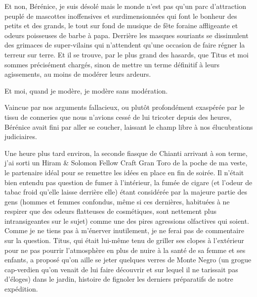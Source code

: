 %
%
%
Et non, Bérénice, je suis désolé mais le monde n’est pas qu’un parc d’attraction peuplé de mascottes inoffensives et surdimensionnées qui font le bonheur des petits et des grands, le tout sur fond de musique de fête foraine affligeante et odeurs poisseuses de barbe à papa. Derrière les masques souriants se dissimulent des grimaces de super-vilains qui n’attendent qu’une occasion de faire régner la terreur sur terre. Et il se trouve, par le plus grand des hasards, que Titus et moi sommes précisément chargés, sinon de mettre un terme définitif à leurs agissements, au moins de modérer leurs ardeurs.

Et moi, quand je modère, je modère sans modération.

Vaincue par nos arguments fallacieux, ou plutôt profondément exaspérée par le tissu de conneries que nous n’avions cessé de lui tricoter depuis des heures, Bérénice avait fini par aller se coucher, laissant le champ libre à nos élucubrations judiciaires. \\{
}%

Une heure plus tard environ, la seconde fias\-que de Chianti arrivant à son terme, j’ai sorti un Hiram \& Solomon Fellow Craft Gran Toro de la poche de ma veste, le partenaire idéal pour se remettre les idées en place en fin de soirée. Il n’était bien entendu pas question de fumer à l’intérieur, la fumée de cigare (et l’odeur de tabac froid qu’elle laisse derrière elle) étant considérée par la majeure partie des gens (hommes et femmes confondus, même si ces dernières, habituées à ne respirer que des odeurs flatteuses de cosmétiques, sont nettement plus intransigeantes sur le sujet) comme une des pires agressions olfactives qui soient. Comme je ne tiens pas à m’énerver inutilement, je ne ferai pas de commentaire sur la question. Titus, qui était lui-même tenu de griller ses clopes à l’extérieur pour ne pas pourrir l’atmosphère en plus de nuire à la santé de sa femme et ses enfants, a proposé qu’on aille se jeter quelques verres de Monte Negro (un grogue cap-verdien qu’on venait de lui faire découvrir et sur lequel il ne tarissait pas d’éloges) dans le jardin, histoire de fignoler les derniers préparatifs de notre expédition.

